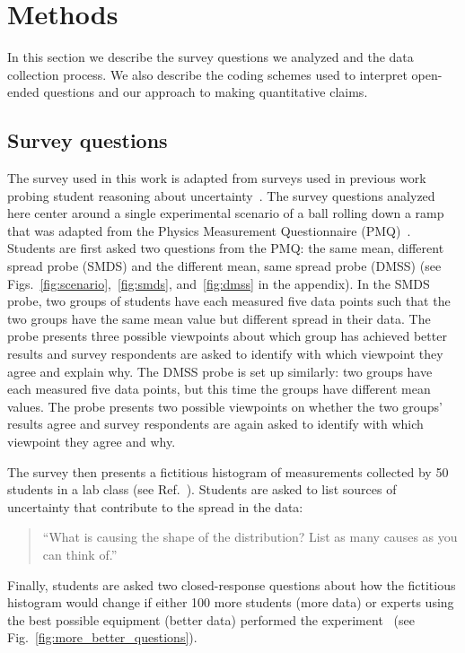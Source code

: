 \documentclass[english,aps,prstper,reprint,showpacs,longbibliography,superscriptaddress,nofootinbib]{revtex4-2}
\begin{document}
\section{Methods}

In this section we describe the survey questions we analyzed and the data collection process. We also describe the coding schemes used to interpret open-ended questions and our approach to making quantitative claims.

\subsection{Survey questions}

The survey used in this work is adapted from surveys used in previous work probing student reasoning about uncertainty~\cite{SchangTBD,StumpTBD,Allie1998}. The survey questions analyzed here center around a single experimental scenario of a ball rolling down a ramp that was adapted from the Physics Measurement Questionnaire (PMQ)~\cite{Allie1998}. Students are first asked two questions from the PMQ: the same mean, different spread probe (SMDS) and the different mean, same spread probe (DMSS) (see Figs.~\ref{fig:scenario},~\ref{fig:smds}, and~\ref{fig:dmss} in the appendix). In the SMDS probe, two groups of students have each measured five data points such that the two groups have the same mean value but different spread in their data. The probe presents three possible viewpoints about which group has achieved better results and survey respondents are asked to identify with which viewpoint they agree and explain why. The DMSS probe is set up similarly: two groups have each measured five data points, but this time the groups have different mean values. The probe presents two possible viewpoints on whether the two groups' results agree and survey respondents are again asked to identify with which viewpoint they agree and why.

The survey then presents a fictitious histogram of measurements collected by 50 students in a lab class (see Ref.~\cite{StumpTBD}). Students are asked to list sources of uncertainty that contribute to the spread in the data:
\begin{quote}
    ``What is causing the shape of the distribution? List as many causes as you can think of.''
\end{quote}
Finally, students are asked two closed-response questions about how the fictitious histogram would change if either 100 more students (more data) or experts using the best possible equipment (better data) performed the experiment~\cite{SchangTBD} (see Fig.~\ref{fig:more_better_questions}).
\end{document}
